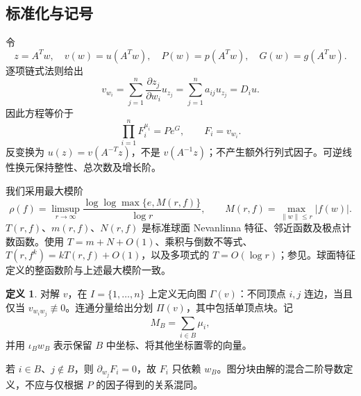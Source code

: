 \documentclass[UTF8,11pt,a4paper,fontset=fandol]{ctexart}
\theoremstyle{definition}\newtheorem{definition}[theorem]{定义}
\theoremstyle{remark}\newtheorem{remark}[theorem]{注}
\begin{document}
\subsection{标准化与记号}
令
\begin{equation}\label{eq:change}
z=A^Tw,\quad v(w)=u(A^Tw),\quad P(w)=p(A^Tw),\quad G(w)=g(A^Tw).
\end{equation}
逐项链式法则给出
\[
v_{w_i}=\sum_{j=1}^n\frac{\partial z_j}{\partial w_i}u_{z_j}
=\sum_{j=1}^n a_{ij}u_{z_j}=D_i u.
\]
因此方程等价于
\begin{equation}\label{eq:standard}
\prod_{i=1}^n F_i^{\mu_i}=Pe^G,\qquad F_i=v_{w_i}.
\end{equation}
反变换为 $u(z)=v(A^{-T}z)$，不是 $v(A^{-1}z)$；不产生额外行列式因子。可逆线性换元保持整性、总次数及增长阶。

我们采用最大模阶
\[
\rho(f)=\limsup_{r\to\infty}
\frac{\log\log\max\{e,M(r,f)\}}{\log r},\qquad
M(r,f)=\max_{\lVert w\rVert\le r}|f(w)|.
\]
$T(r,f)$、$m(r,f)$、$N(r,f)$ 是标准球面 Nevanlinna 特征、邻近函数及极点计数函数。使用 $T=m+N+O(1)$、乘积与倒数不等式、$T(r,f^k)=kT(r,f)+O(1)$，以及多项式的 $T=O(\log r)$；参见\cite{Stoll1974}。球面特征定义的整函数阶与上述最大模阶一致。

\begin{definition}
对解 $v$，在 $I=\{1,\ldots,n\}$ 上定义无向图 $\Gamma(v)$：不同顶点 $i,j$ 连边，当且仅当 $v_{w_iw_j}\not\equiv0$。连通分量给出分划 $\Pi(v)$，其中包括单顶点块。记
\[
M_B=\sum_{i\in B}\mu_i,
\]
并用 $\iota_Bw_B$ 表示保留 $B$ 中坐标、将其他坐标置零的向量。
\end{definition}
若 $i\in B$、$j\notin B$，则 $\partial_{w_j}F_i=0$，故 $F_i$ 只依赖 $w_B$。图分块由解的混合二阶导数定义，不应与仅根据 $P$ 的因子得到的关系混同。
\end{document}
